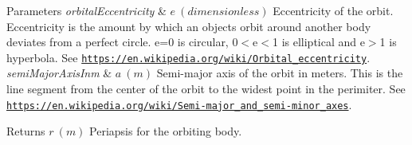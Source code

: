 \begin{DoxyParams}{Parameters}
{\em orbital\+Eccentricity} & $ e\ (dimensionless)$ Eccentricity of the orbit. Eccentricity is the amount by which an objects orbit around another body deviates from a perfect circle. e=0 is circular, 0$<$e$<$1 is elliptical and e$>$1 is hyperbola. See \href{https://en.wikipedia.org/wiki/Orbital_eccentricity}{\tt https\+://en.\+wikipedia.\+org/wiki/\+Orbital\+\_\+eccentricity}. \\
\hline
{\em semi\+Major\+Axis\+Inm} & $ a\ (m)$ Semi-\/major axis of the orbit in meters. This is the line segment from the center of the orbit to the widest point in the perimiter. See \href{https://en.wikipedia.org/wiki/Semi-major_and_semi-minor_axes}{\tt https\+://en.\+wikipedia.\+org/wiki/\+Semi-\/major\+\_\+and\+\_\+semi-\/minor\+\_\+axes}. \\
\hline
\end{DoxyParams}
\begin{DoxyReturn}{Returns}
$ r\ (m)$ Periapsis for the orbiting body. 
\end{DoxyReturn}
